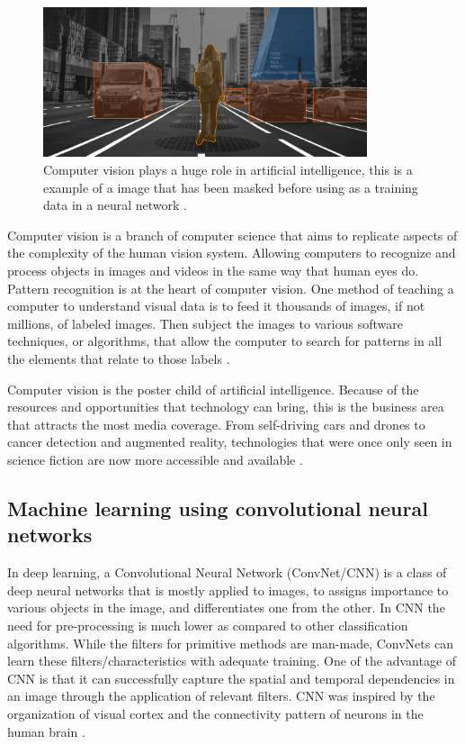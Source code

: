 \begin{figure}[ht]
  \centering
  \includegraphics[width=0.85\textwidth]{graphics/mask.png}
  \caption{Computer vision plays a huge role in artificial intelligence, this is a example of a image that has been masked before using as a training data in a neural network \cite{ambalina_5_2020}.}
  \label{fig:mask}
\end{figure}

Computer vision is a branch of computer science that aims to replicate aspects of the complexity of the human vision system. Allowing computers to recognize and process objects in images and videos in the same way that human eyes do. Pattern recognition is at the heart of computer vision. One method of teaching a computer to understand visual data is to feed it thousands of images, if not millions, of labeled images. Then subject the images to various software techniques, or algorithms, that allow the computer to search for patterns in all the elements that relate to those labels \cite{mihajlovic_everything_2019}.

Computer vision is the poster child of artificial intelligence. Because of the resources and opportunities that technology can bring, this is the business area that attracts the most media coverage. From self-driving cars and drones to cancer detection and augmented reality, technologies that were once only seen in science fiction are now more accessible and available \cite{ambalina_5_2020}.



\subsection{Machine learning using convolutional neural networks}
In deep learning, a Convolutional Neural Network (ConvNet/CNN) is a class of deep neural networks that is mostly applied to images, to assigns importance to various objects in the image, and differentiates one from the other. 
In CNN the need for pre-processing is much lower as compared to other classification algorithms. 
While the filters for primitive methods are man-made, ConvNets can learn these filters/characteristics with adequate training. 
One of the advantage of CNN is that it can successfully capture the spatial and temporal dependencies in an image through the application of relevant filters. 
CNN was inspired by the organization of visual cortex and the connectivity pattern of neurons in the human brain \cite{saha_comprehensive_2018}. 

